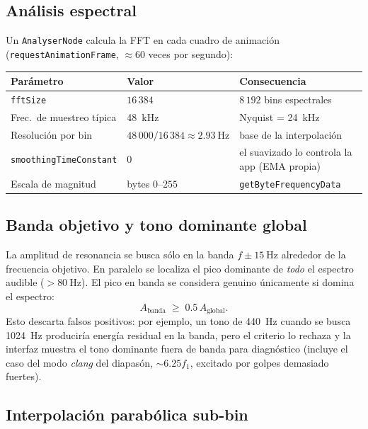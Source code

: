 \documentclass[11pt,a4paper]{article}
\begin{document}
\subsection{Análisis espectral}

Un \texttt{AnalyserNode} calcula la FFT en cada cuadro de animación
(\texttt{requestAnimationFrame}, $\approx 60$ veces por segundo):

\begin{center}
\begin{tabular}{@{}lll@{}}
\toprule
Parámetro & Valor & Consecuencia \\
\midrule
\texttt{fftSize} & $16\,384$ & $8\,192$ bins espectrales \\
Frec.\ de muestreo típica & \SI{48}{\kilo\hertz} & Nyquist = \SI{24}{\kilo\hertz} \\
Resolución por bin & $48\,000/16\,384 \approx \SI{2.93}{\hertz}$ & base de la interpolación \\
\texttt{smoothingTimeConstant} & $0$ & el suavizado lo controla la app (EMA propia) \\
Escala de magnitud & bytes $0$--$255$ & \texttt{getByteFrequencyData} \\
\bottomrule
\end{tabular}
\end{center}

\subsection{Banda objetivo y tono dominante global}

La amplitud de resonancia se busca sólo en la banda $f \pm \SI{15}{\hertz}$ alrededor de la
frecuencia objetivo. En paralelo se localiza el pico dominante de \emph{todo} el espectro
audible ($> \SI{80}{\hertz}$). El pico en banda se considera genuino únicamente si domina el
espectro:
\begin{equation}
  A_{\text{banda}} \;\ge\; 0.5\, A_{\text{global}} .
\end{equation}
Esto descarta falsos positivos: por ejemplo, un tono de \SI{440}{\hertz} cuando se busca
\SI{1024}{\hertz} produciría energía residual en la banda, pero el criterio lo rechaza y la
interfaz muestra el tono dominante fuera de banda para diagnóstico (incluye el caso del modo
\emph{clang} del diapasón, $\sim 6.25 f_1$, excitado por golpes demasiado fuertes).

\subsection{Interpolación parabólica sub-bin}
\label{sec:interpolacion}
\end{document}
